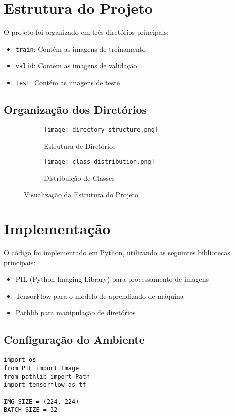 \documentclass[12pt,a4paper]{article}
\begin{document}
\section{Estrutura do Projeto}
O projeto foi organizado em três diretórios principais:
\begin{itemize}
    \item \texttt{train}: Contém as imagens de treinamento
    \item \texttt{valid}: Contém as imagens de validação
    \item \texttt{test}: Contém as imagens de teste
\end{itemize}

\subsection{Organização dos Diretórios}
\begin{figure}[H]
\centering
\begin{subfigure}[b]{0.45\textwidth}
    \texttt{[image: directory\_structure.png]}
    \caption{Estrutura de Diretórios}
\end{subfigure}
\begin{subfigure}[b]{0.45\textwidth}
    \texttt{[image: class\_distribution.png]}
    \caption{Distribuição de Classes}
\end{subfigure}
\caption{Visualização da Estrutura do Projeto}
\end{figure}

\section{Implementação}
O código foi implementado em Python, utilizando as seguintes bibliotecas principais:
\begin{itemize}
    \item PIL (Python Imaging Library) para processamento de imagens
    \item TensorFlow para o modelo de aprendizado de máquina
    \item Pathlib para manipulação de diretórios
\end{itemize}

\subsection{Configuração do Ambiente}
\begin{lstlisting}
import os
from PIL import Image
from pathlib import Path
import tensorflow as tf

IMG_SIZE = (224, 224)
BATCH_SIZE = 32
\end{lstlisting}
\end{document}
